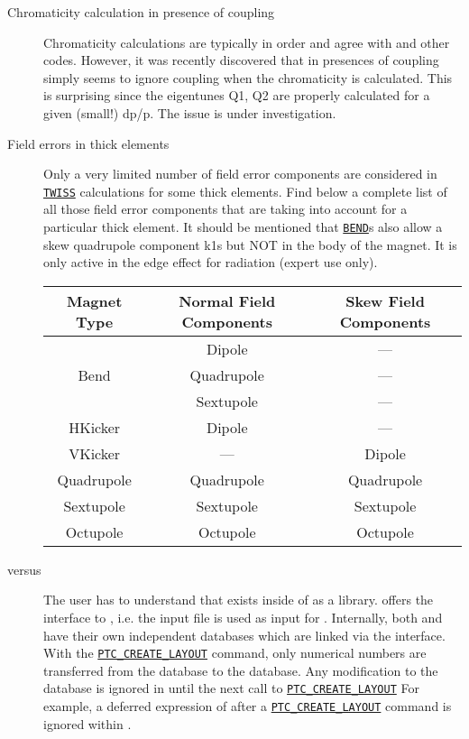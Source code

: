 \begin{description}
\item[Chromaticity calculation in presence of coupling] 
  Chromaticity calculations are typically in order and agree with \ptc
  and other codes. However, it was recently discovered that in
  presences of coupling \madx simply seems to ignore coupling when the
  chromaticity is calculated. This is surprising since the eigentunes
  Q1, Q2 are properly calculated for a given (small!) dp/p. The issue
  is under investigation.  


\item[Field errors in thick elements]
  Only a very limited number of field error components are
  considered in \hyperref[chap:twiss]{\tt TWISS} calculations for some
  thick elements. Find below 
  a complete list of all those field error components that
  are taking into account for a particular thick element. It
  should be mentioned that \hyperref[sec:bend]{\tt BEND}s also allow a
  skew quadrupole component k1s but NOT in the body of the magnet. It is
  only active in the edge effect for radiation (expert use only). 


{\renewcommand{\arraystretch}{2}
  \begin{tabular}{c | c | c}
    \hline 
    \textbf{Magnet Type} & \textbf{Normal Field Components} & \textbf{Skew Field Components} \\ 
    \hline
    & Dipole & ---\\
    Bend & Quadrupole & ---\\
    & Sextupole & ---\\
    \hline
    HKicker & Dipole & ---\\
    \hline
    VKicker & --- & Dipole\\
    \hline
    Quadrupole & Quadrupole & Quadrupole \\
    \hline
    Sextupole & Sextupole & Sextupole \\
    \hline
    Octupole & Octupole & Octupole \\
    \hline
  \end{tabular}
}

\item[\madx versus \ptc] 
  The user has to understand that \ptc exists inside of \madx as a
  library. \madx offers the interface to \ptc, i.e. the \madx input
  file is used as input for \ptc. Internally, both \ptc and \madx have
  their own independent databases which are linked via the
  interface. With the
  \hyperref[sec:ptc_create_layout]{\tt PTC\_CREATE\_LAYOUT}
  command, only numerical numbers are transferred from the \madx
  database to the \ptc database. Any modification to the \madx
  database is ignored in \ptc until the next call to
  \hyperref[sec:ptc_create_layout]{\tt PTC\_CREATE\_LAYOUT}
  For example, a deferred expression of \madx after a
  \hyperref[sec:ptc_create_layout]{\tt PTC\_CREATE\_LAYOUT}
  command is ignored within \ptc.  
  

\end{description}
